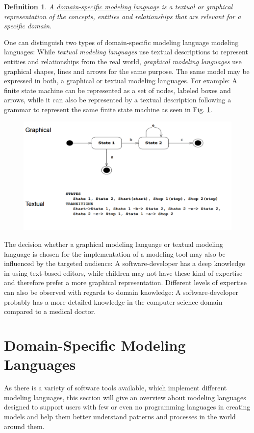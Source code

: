 \documentclass[runningheads,a4paper]{llncs}
\newtheorem{defn}{Definition}
\begin{document}
\begin{defn}
\label{def:dsml}
A \underline{domain-specific modeling language} is a textual or graphical representation of the concepts, entities and relationships that are 
relevant for a specific domain.
\end{defn}
One can distinguish two types of domain-specific modeling language modeling languages:
While \emph{textual modeling languages} use textual descriptions to represent entities and relationships from the real world,
\emph{graphical modeling languages} use graphical shapes, lines and arrows for the same purpose.
The same model may be expressed in both, a graphical or textual modeling languages.
For example: A finite state machine can be represented as a set of nodes, labeled boxes and arrows, while it can also be 
represented by a textual description following a grammar to represent the same finite state machine as seen in Fig. \ref{compare:textgraphiclang}.
\begin{figure}[H]
      \centering
      \includegraphics[width=.8\textwidth]{images/GraficalTextualComparison.PNG}
      \label{compare:textgraphiclang}
\end{figure}
The decision whether a graphical modeling language or textual modeling language is chosen for the implementation of a modeling tool 
may also be influenced by the targeted audience: A software-developer has a deep knowledge in using text-based editors, while 
children may not have these kind of expertise and therefore prefer a more graphical representation. 
Different levels of expertise can also be observed with regards to domain knowledge:
A software-developer probably has a more detailed knowledge in the computer science domain compared to a medical doctor.


 \section{Domain-Specific Modeling Languages}
 \label{section:dsml}
 As there is a variety of software tools available, which implement different modeling languages, this section will give an overview 
 about modeling languages designed to support users with few or even no programming languages in creating models and help them better 
 understand patterns and processes in the world around them.
 
\end{document}
